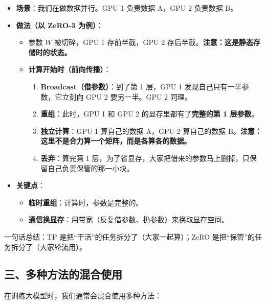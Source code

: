 \begin{itemize}
\tightlist
\item
  \textbf{场景}：我们在做数据并行。GPU 1 负责数据 A，GPU 2 负责数据 B。
\item
  \textbf{做法（以 ZeRO-3 为例）}：

  \begin{itemize}
  \tightlist
  \item
    参数 \(W\) 被切碎，GPU 1 存前半截，GPU 2 存后半截。\textbf{注意：这是静态存储时的状态。}
  \item
    \textbf{计算开始时（前向传播）}：

    \begin{enumerate}
    \def\labelenumi{\arabic{enumi}.}
    \tightlist
    \item
      \textbf{Broadcast（借参数）}：到了第 1 层，GPU 1 发现自己只有一半参数，它立刻向 GPU 2 要另一半。GPU 2 同理。
    \item
      \textbf{重组}：此时，GPU 1 和 GPU 2 的显存里都有了\textbf{完整的第 1 层参数}。
    \item
      \textbf{独立计算}：GPU 1 算自己的数据 A，GPU 2 算自己的数据 B。\textbf{注意：这里不是合力算一个矩阵，而是各算各的数据。}
    \item
      \textbf{丢弃}：算完第 1 层，为了省显存，大家把借来的参数马上删掉，只保留自己负责保管的那一小块。
    \end{enumerate}
  \end{itemize}
\item
  \textbf{关键点}：

  \begin{itemize}
  \tightlist
  \item
    \textbf{临时重组}：计算时，参数是完整的。
  \item
    \textbf{通信换显存}：用带宽（反复借参数、扔参数）来换取显存空间。
  \end{itemize}
\end{itemize}

一句话总结：TP 是把``干活''的任务拆分了（大家一起算）；ZeRO 是把``保管''的任务拆分了（大家轮流用）。

\hypertarget{ux4e09ux591aux79cdux65b9ux6cd5ux7684ux6df7ux5408ux4f7fux7528}{%
\subsection{三、多种方法的混合使用}\label{ux4e09ux591aux79cdux65b9ux6cd5ux7684ux6df7ux5408ux4f7fux7528}}

在训练大模型时，我们通常会混合使用多种方法：

